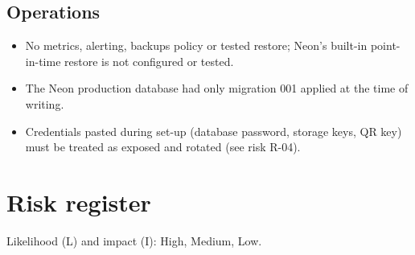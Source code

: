 \documentclass[11pt,a4paper]{article}
\begin{document}
\subsection{Operations}
\begin{itemize}
  \item No metrics, alerting, backups policy or tested restore; Neon's built-in point-in-time restore is not configured
    or tested.
  \item The Neon production database had only migration 001 applied at the time of writing.
  \item Credentials pasted during set-up (database password, storage keys, QR key) must be treated as exposed and
    rotated (see risk R-04).
\end{itemize}

\section{Risk register}
Likelihood (L) and impact (I): High, Medium, Low.
\end{document}
